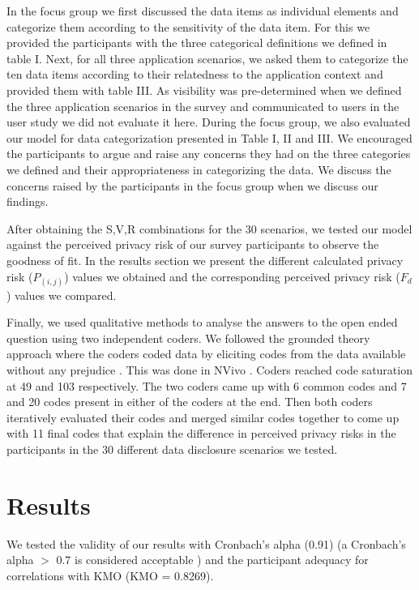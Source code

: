 \documentclass[10pt]{article}
\begin{document}
In the focus group we first discussed the data items as individual elements and categorize them according to the sensitivity of the data item. For this we provided the participants with the three categorical definitions we defined in table I. Next, for all three application scenarios, we asked them to categorize the ten data items according to their relatedness to the application context and provided them with table III. As visibility was pre-determined when we defined the three application scenarios in the survey and communicated to users in the user study we did not evaluate it here. During the focus group, we also evaluated our model for data categorization presented in  Table I, II and III. We encouraged the participants to argue and raise any concerns they had on the three categories we defined and their appropriateness in categorizing the data. We discuss the concerns raised by the participants in the focus group when we discuss our findings. 

After obtaining the S,V,R combinations for the 30 scenarios, we tested our model against the perceived privacy risk of our survey participants to observe the goodness of fit. In the results section we present the different calculated privacy risk ($P_{(i,j)}$) values we obtained and the corresponding perceived privacy risk ($F_d$) values we compared.

Finally, we used qualitative methods to analyse the answers to the open ended question using two independent coders. We followed the grounded theory approach where the coders coded data by eliciting codes from the data available without any prejudice \cite {wong2017eliciting}. This was done in NVivo \cite {saldana2015coding}. Coders reached code saturation at 49 and 103 respectively. The two coders came up with 6 common codes and 7 and 20 codes present in either of the coders at the end. Then both coders iteratively evaluated their codes and merged similar codes together to come up with 11 final codes that explain the difference in perceived privacy risks in the participants in the 30 different data disclosure scenarios we tested.

\section {Results}

We tested the validity of our results with Cronbach's alpha (0.91) (a Cronbach's alpha $>$ 0.7 is considered acceptable \cite {nunnally1967psychometric}) and the participant adequacy for correlations with KMO (KMO =  0.8269). 
\end{document}
